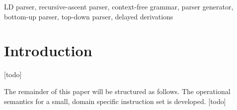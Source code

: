 \documentclass[A4]{sig-alternate}
\begin{document}

\begin{keywords}
LD parser, recursive-ascent parser, context-free grammar, parser generator, bottom-up parser, top-down parser, delayed derivations
\end{keywords}

\section{Introduction}

[todo]

The remainder of this paper will be structured as follows. 
The operational semantics for a small, domain specific instruction set is developed.
[todo]


%




\end{document}
